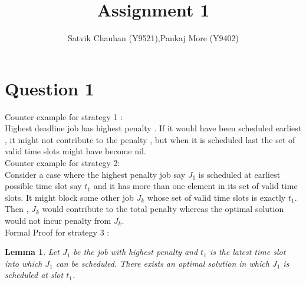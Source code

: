 \documentclass[11pt]{article}
\title{Assignment 1}
\author{Satvik Chauhan (Y9521),Pankaj More (Y9402)}
\newtheorem{lemma}[theorem]{Lemma}
\begin{document}
\maketitle
\section*{Question 1}
Counter example for strategy 1 : \\
Highest deadline job has highest penalty . If it would have been scheduled earliest , it might not contribute to the penalty , but when it is scheduled last the set of valid time slots might have become nil. \\
Counter example for strategy 2: \\
Consider a case where the highest penalty job say $J_1$ is scheduled at earliest possible time slot say $t_1$ and it has more than one element in its set of valid time slots. It might block some other job $J_k$ whose set of valid time slots is exactly $t_1$. Then , $J_k$ would contribute to the total penalty whereas the optimal solution would not incur penalty from $J_k$.  \\
Formal Proof for strategy 3 : 
\begin{lemma}
Let $J_{1}$ be the job with highest penalty and $t_{1}$ is the latest time slot into which $J_{1}$ can be scheduled.
There exists an optimal solution in which $J_{1}$ is scheduled at slot $t_{1}$.
\end{lemma}
\end{document}

